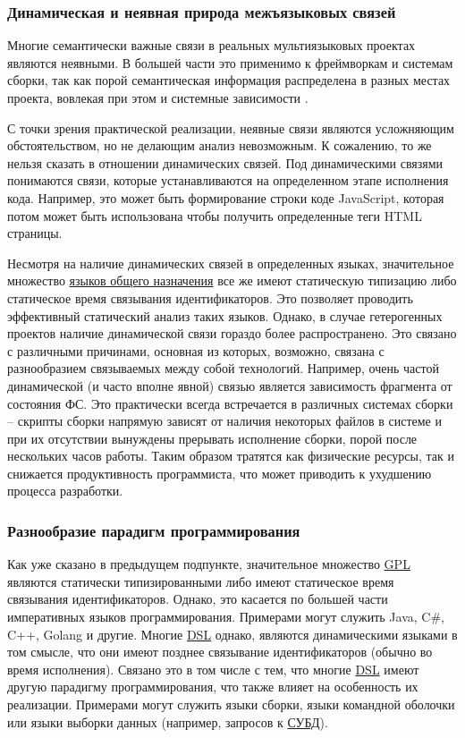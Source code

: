 \subsubsection{Динамическая и неявная природа межъязыковых связей}

Многие семантически важные связи в реальных мультиязыковых проектах являются неявными. В большей части это применимо
к фреймворкам и системам сборки, так как порой семантическая информация распределена в разных местах проекта,
вовлекая при этом и системные зависимости \cite{professional-developers} \cite{external-dependencies}.

С точки зрения практической реализации, неявные связи являются усложняющим обстоятельством, но не
делающим анализ невозможным. К сожалению, то же нельзя сказать в отношении динамических связей. Под
динамическими связями понимаются связи, которые устанавливаются на определенном этапе исполнения кода.
Например, это может быть формирование строки коде JavaScript, которая потом может быть использована чтобы
получить определенные теги HTML страницы.

Несмотря на наличие динамических связей в определенных языках, значительное множество \hyperlink{GPL}{ языков общего назначения}
все же имеют статическую типизацию либо статическое время связывания идентификаторов. Это позволяет проводить
эффективный статический анализ таких языков. Однако, в случае гетерогенных проектов наличие динамической
связи гораздо более распространено. Это связано с различными причинами, основная из которых, возможно,
связана с разнообразием связываемых между собой технологий. Например, очень частой динамической (и часто
вполне явной) связью является зависимость фрагмента от состояния ФС. Это практически всегда встречается
в различных системах сборки -- скрипты сборки напрямую зависят от наличия некоторых файлов в системе и
при их отсутствии вынуждены прерывать исполнение сборки, порой после нескольких часов работы. Таким образом
тратятся как физические ресурсы, так и снижается продуктивность программиста, что может приводить к
ухудшению процесса разработки.

\subsubsection{Разнообразие парадигм программирования}

Как уже сказано в предыдущем подпункте, значительное множество \hyperlink{GPL}{GPL} являются статически типизированными
либо имеют статическое время связывания идентификаторов. Однако, это касается по большей части
императивных языков программирования. Примерами могут служить Java, C\#, C++, Golang и другие.
Многие \hyperlink{DSL}{DSL} однако, являются динамическими языками в том смысле, что они имеют позднее
связывание идентификаторов (обычно во время исполнения). Связано это в том числе с тем, что многие \hyperlink{DSL}{DSL}
имеют другую парадигму программирования, что также влияет на особенность их реализации. Примерами могут служить 
языки сборки, языки командной оболочки или языки выборки данных (например, запросов к \hyperlink{СУБД}{СУБД}).

